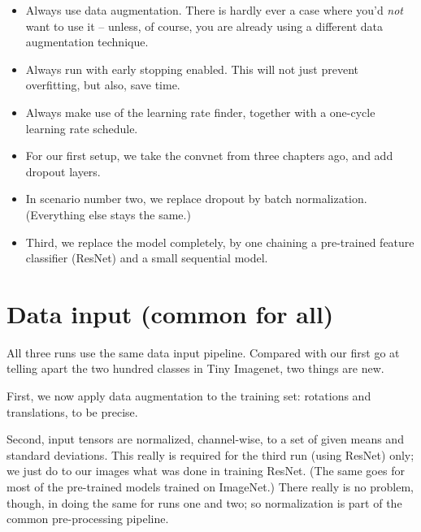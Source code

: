 \documentclass[
  letterpaper,
]{krantz}
\begin{document}
\begin{itemize}
\item
  Always use data augmentation. There is hardly ever a case where you'd
  \emph{not} want to use it -- unless, of course, you are already using
  a different data augmentation technique.
\item
  Always run with early stopping enabled. This will not just prevent
  overfitting, but also, save time.
\item
  Always make use of the learning rate finder, together with a one-cycle
  learning rate schedule.
\item
  For our first setup, we take the convnet from three chapters ago, and
  add dropout layers.
\item
  In scenario number two, we replace dropout by batch normalization.
  (Everything else stays the same.)
\item
  Third, we replace the model completely, by one chaining a pre-trained
  feature classifier (ResNet) and a small sequential model.
\end{itemize}

\hypertarget{data-input-common-for-all}{%
\section{Data input (common for all)}\label{data-input-common-for-all}}

All three runs use the same data input pipeline. Compared with our first
go at telling apart the two hundred classes in Tiny Imagenet, two things
are new.

First, we now apply data augmentation to the training set: rotations and
translations, to be precise.

Second, input tensors are normalized, channel-wise, to a set of given
means and standard deviations. This really is required for the third run
(using ResNet) only; we just do to our images what was done in training
ResNet. (The same goes for most of the pre-trained models trained on
ImageNet.) There really is no problem, though, in doing the same for
runs one and two; so normalization is part of the common pre-processing
pipeline.
\end{document}

